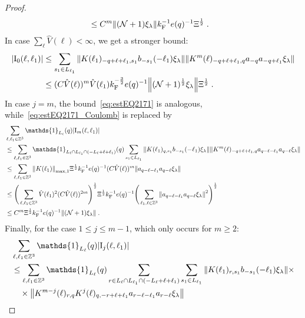 \documentclass[12pt,a4paper]{article}
\numberwithin{equation}{section}
\newcommand{\1}{\mathbb{I}}
\newcommand{\F}{\mathrm{F}}
\newcommand{\I}{\mathrm{I}}
\newcommand{\kF}{k_\F}
\newcommand{\Zstar}{\mathbb{Z}^3} %
\newcommand{\Z}{\mathbb{Z}}
\newcommand{\NN}{\mathcal{N}}
\newcommand{\half}{\frac{1}{2}}
\theoremstyle{plain}
\theoremstyle{definition}
\theoremstyle{remark}
\theoremstyle{plain}
\theoremstyle{definition}
\theoremstyle{remark}
\begin{document}
\begin{proof}
\begin{align}
	&\leq C^m \norm{(\NN+1) \xi_\lambda}
		\kF^{-1} e(q)^{-1} \Xi^\half \;. \label{eq:estEQ2171_Coulomb}
\end{align}
In case $ \sum_\ell \hat{V}(\ell) < \infty $, we get a stronger bound:
\begin{align}
	|\I_0(\ell, \ell_1)|
	&\leq \sum_{s_1 \in L_{\ell_1}}
		\norm{K(\ell_1)_{-q+\ell+\ell_1,s_1} b_{-s_1}(-\ell_1) \xi_\lambda}
		\norm{ K^m(\ell)_{-q+\ell+\ell_1,q}a_{-q}a_{-q+\ell_1} \xi_\lambda } \nonumber\\
	&\leq (C \hat{V}(\ell))^m
		\hat{V}(\ell_1)
		\kF^{-\frac 32} e(q)^{-1}
		\norm{(\NN+1)^\half\xi_\lambda} \Xi^\half \;. \label{eq:estEQ2171}
\end{align}
In case $ j = m $, the bound~\eqref{eq:estEQ2171} is analogous, while~\eqref{eq:estEQ2171_Coulomb} is replaced by
\begin{align}
	&\sum_{\ell,\ell_1 \in \Zstar} \mathds{1}_{L_\ell}(q) |\I_m(\ell, \ell_1)| \nonumber\\
	&\leq \sum_{\ell,\ell_1 \in \Zstar} \mathds{1}_{L_\ell \cap L_{\ell_1} \cap (-L_\ell + \ell + \ell_1)}(q) \sum\limits_{s_1 \in L_{\ell_1}}
		\norm{K(\ell_1)_{q,s_1} b_{-s_1}(-\ell_1)  \xi_\lambda} 
		\norm{ K^m(\ell)_{-q+\ell+\ell_1,q}a_{q-\ell-\ell_1}a_{q-\ell}  \xi_\lambda } \nonumber\\
	&\leq \sum_{\ell,\ell_1 \in \Zstar} 
		\norm{K(\ell_1)}_{\max,1} \Xi^{\half}
		k_{\F}^{-1} e(q)^{-1} (C \hat{V}(\ell))^m \norm{ a_{q-\ell-\ell_1}a_{q-\ell}  \xi_\lambda } \nonumber\\
	&\leq \Bigg( \sum_{\ell,\ell_1 \in \Zstar} \hat{V}(\ell_1)^2 (C \hat{V}(\ell))^{2m} \Bigg)^{\half}
		\Xi^{\half}
		k_{\F}^{-1} e(q)^{-1} \Bigg( \sum_{\ell_1,\ell \in \Zstar}  \norm{ a_{q-\ell-\ell_1}a_{q-\ell}  \xi_\lambda }^2 \Bigg)^{\half} \nonumber\\
	&\leq C^m \Xi^\half
		\kF^{-1} e(q)^{-1}  \norm{(\NN+1) \xi_\lambda} \;.
\end{align}
Finally, for the case $ 1 \le j \le m-1 $, which only occurs for $ m \ge 2 $:
\begin{align}
	&\sum_{\ell,\ell_1 \in \Zstar} \mathds{1}_{L_\ell}(q) |\I_j(\ell, \ell_1)| \nonumber\\
	&\leq \sum_{\ell,\ell_1 \in \Zstar} \mathds{1}_{L_\ell}(q) \sum\limits_{r\in L_{\ell} \cap L_{\ell_1} \cap (-L_{\ell}+\ell+\ell_1)}
		\sum\limits_{s_1\in L_{\ell_1}} 
		\norm{K(\ell_1)_{r,s_1} b_{-s_1}(-\ell_1) \xi_\lambda} \times \nonumber\\
	&\quad \times \norm{ K^{m-j}(\ell)_{r,q} K^j(\ell)_{q,-r+\ell+\ell_1} a_{r-\ell-\ell_1} a_{r-\ell} \xi_\lambda } \nonumber\\

\end{align}
\end{proof}
\end{document}
